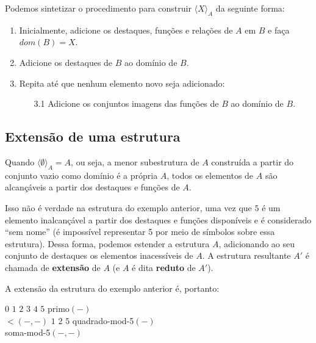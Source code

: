 Podemos sintetizar o procedimento para construir $\langle X \rangle_A$ da seguinte forma:
\begin{enumerate}
    \item Inicialmente, adicione os destaques, funções e relações de $A$ em $B$ e faça $dom(B) = X$.
    \item Adicione os destaques de $B$ ao domínio de $B$.
    \item Repita até que nenhum elemento novo seja adicionado:
    \begin{enumerate}
        \item[3.1] Adicione os conjuntos imagens das funções de $B$ ao domínio de $B$.
    \end{enumerate}  
\end{enumerate}

\subsection{Extensão de uma estrutura}

Quando $\langle \emptyset \rangle_A = A$, ou seja, a menor subestrutura de $A$ construída a partir do conjunto vazio como domínio é a própria $A$, todos os elementos de $A$ são alcançáveis a partir dos destaques e funções de $A$.

Isso não é verdade na estrutura do exemplo anterior, uma vez que $5$ é um elemento inalcançável a partir dos destaques e funções disponíveis e é considerado ``sem nome'' (é impossível representar 5 por meio de símbolos sobre essa estrutura). Dessa forma, podemos estender a estrutura $A$, adicionando ao seu conjunto de destaques os elementos inacessíveis de $A$. A estrutura resultante $A'$ é chamada de \textbf{extensão} de $A$ (e $A$ é dita \textbf{reduto} de $A'$).
    
A extensão da estrutura do exemplo anterior é, portanto:
\begin{center}
    \begin{structure}
        {}
        {$0$ $1$ $2$ $3$ $4$ $5$}
        {primo$(-)$\\$<$$(-,-)$}
        {$1$ $2$ $5$}
        {quadrado-mod-5$(-)$\\soma-mod-5$(-,-)$}
    \end{structure} 
\end{center}